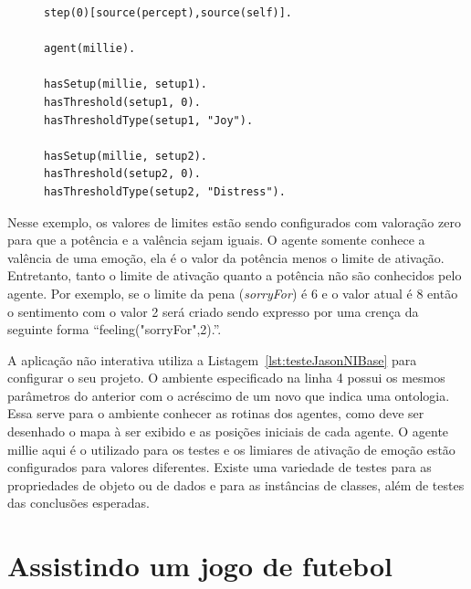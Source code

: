 \lstset{linewidth=80mm}
\begin{figure}
	\begin{lstlisting}[frame=trbl,
caption=Parte do código do agente para aplicação interativa de teste,
label=lst:testeJasonIntSetup]
step(0)[source(percept),source(self)].

agent(millie).

hasSetup(millie, setup1).
hasThreshold(setup1, 0).
hasThresholdType(setup1, "Joy").

hasSetup(millie, setup2).
hasThreshold(setup2, 0).
hasThresholdType(setup2, "Distress").
	\end{lstlisting}
\end{figure}

Nesse exemplo, os valores de limites estão sendo configurados com valoração
zero para que a potência e a valência sejam iguais. O agente somente conhece
a valência de uma emoção, ela é o valor da potência menos o limite de
ativação. Entretanto, tanto o limite de ativação quanto a potência não são
conhecidos pelo agente. Por exemplo, se o limite da pena (\emph{sorryFor}) é 6
e o valor atual é 8 então o sentimento com o valor 2 será criado sendo
expresso por uma crença da seguinte forma ``feeling("sorryFor",2).''.


\begin{center}
    \begin{minipage}{140mm}
	\lstset{linewidth=140mm}
	
    \end{minipage}
\end{center}

A aplicação não interativa utiliza a Listagem~\ref{lst:testeJasonNIBase} para
configurar o seu projeto. O ambiente especificado na linha 4 possui os mesmos
parâmetros do anterior com o acréscimo de um novo que indica uma ontologia.
Essa serve para o ambiente conhecer as rotinas dos agentes, como
deve ser desenhado o mapa à ser exibido e as posições iniciais de cada
agente. O agente millie aqui é o utilizado para os testes e os limiares de
ativação de emoção estão configurados para valores diferentes. Existe uma
variedade de testes para as propriedades de objeto ou de dados e para as
instâncias de classes, além de testes das conclusões esperadas.

\section{Assistindo um jogo de futebol} \label{ch:cdu:svc}

